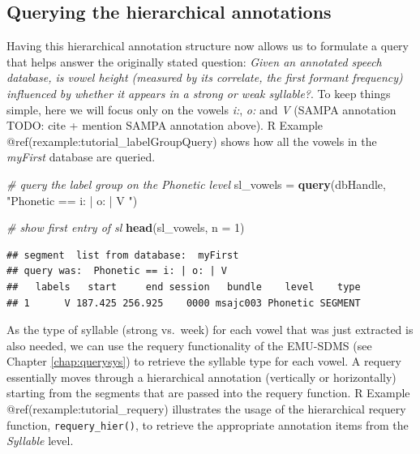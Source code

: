 \documentclass[]{book}
\newenvironment{Shaded}{\begin{snugshade}}{\end{snugshade}}
\newcommand{\KeywordTok}[1]{\textcolor[rgb]{0.13,0.29,0.53}{\textbf{{#1}}}}
\newcommand{\DataTypeTok}[1]{\textcolor[rgb]{0.13,0.29,0.53}{{#1}}}
\newcommand{\DecValTok}[1]{\textcolor[rgb]{0.00,0.00,0.81}{{#1}}}
\newcommand{\StringTok}[1]{\textcolor[rgb]{0.31,0.60,0.02}{{#1}}}
\newcommand{\CommentTok}[1]{\textcolor[rgb]{0.56,0.35,0.01}{\textit{{#1}}}}
\newcommand{\NormalTok}[1]{{#1}}
\theoremstyle{definition}
\theoremstyle{definition}
\theoremstyle{definition}
\theoremstyle{remark}
\begin{document}
\subsection{Querying the hierarchical
annotations}\label{querying-the-hierarchical-annotations}

Having this hierarchical annotation structure now allows us to formulate
a query that helps answer the originally stated question: \emph{Given an
annotated speech database, is vowel height (measured by its correlate,
the first formant frequency) influenced by whether it appears in a
strong or weak syllable?}. To keep things simple, here we will focus
only on the vowels \emph{i:}, \emph{o:} and \emph{V} (SAMPA annotation
TODO: cite + mention SAMPA annotation above). R Example
@ref(rexample:tutorial\_labelGroupQuery) shows how all the vowels in the
\emph{myFirst} database are queried.

\begin{Shaded}
\begin{Highlighting}[]
\CommentTok{# query the label group on the Phonetic level}
\NormalTok{sl_vowels =}\StringTok{ }\KeywordTok{query}\NormalTok{(dbHandle, }\StringTok{"Phonetic == i: | o: | V "}\NormalTok{)}

\CommentTok{# show first entry of sl}
\KeywordTok{head}\NormalTok{(sl_vowels, }\DataTypeTok{n =} \DecValTok{1}\NormalTok{)}
\end{Highlighting}
\end{Shaded}

\begin{verbatim}
## segment  list from database:  myFirst 
## query was:  Phonetic == i: | o: | V  
##   labels   start     end session   bundle    level    type
## 1      V 187.425 256.925    0000 msajc003 Phonetic SEGMENT
\end{verbatim}

As the type of syllable (strong vs.~week) for each vowel that was just
extracted is also needed, we can use the requery functionality of the
EMU-SDMS (see Chapter \ref{chap:querysys}) to retrieve the syllable type
for each vowel. A requery essentially moves through a hierarchical
annotation (vertically or horizontally) starting from the segments that
are passed into the requery function. R Example
@ref(rexample:tutorial\_requery) illustrates the usage of the
hierarchical requery function, \texttt{requery\_hier()}, to retrieve the
appropriate annotation items from the \emph{Syllable} level.
\end{document}
